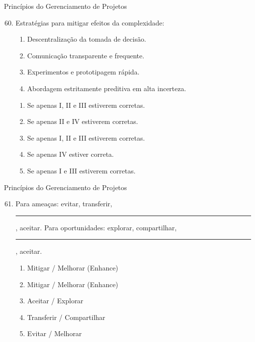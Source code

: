 \documentclass{beamer}
\begin{document}
\begin{frame}{Princípios do Gerenciamento de Projetos}
	\begin{enumerate}
		\setcounter{enumi}{59}
		\justifying
		\item Estratégias para mitigar efeitos da complexidade:
		\begin{enumerate}[I]
			\item Descentralização da tomada de decisão.
			\item Comunicação transparente e frequente.
			\item Experimentos e prototipagem rápida.
			\item Abordagem estritamente preditiva em alta incerteza.
		\end{enumerate}
		\begin{enumerate}[a]
			\item Se apenas I, II e III estiverem corretas.
			\item Se apenas II e IV estiverem corretas.
			\item \alert<2>{Se apenas I, II e III estiverem corretas.}
			\item Se apenas IV estiver correta.
			\item Se apenas I e III estiverem corretas.
		\end{enumerate}
	\end{enumerate}
\end{frame}

\begin{frame}{Princípios do Gerenciamento de Projetos}
	\begin{enumerate}
		\setcounter{enumi}{60}
		\justifying
		\item Para ameaças: evitar, transferir, \rule{50pt}{1pt}, aceitar. Para oportunidades: explorar, compartilhar, \rule{50pt}{1pt}, aceitar.
		\begin{enumerate}[a]
			\item Mitigar / Melhorar (Enhance)
			\item \alert<2>{Mitigar / Melhorar (Enhance)}
			\item Aceitar / Explorar
			\item Transferir / Compartilhar
			\item Evitar / Melhorar
		\end{enumerate}
	\end{enumerate}
\end{frame}
\end{document}
